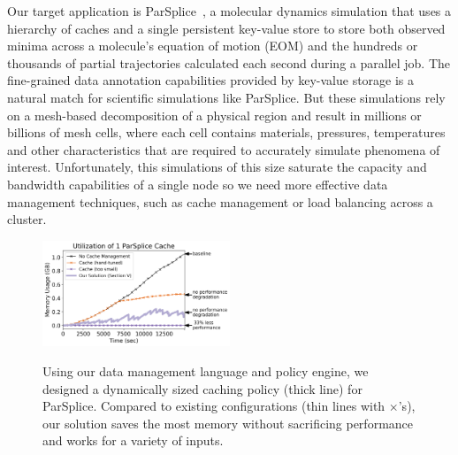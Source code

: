 Our target application is ParSplice~\cite{perez:jctc20150parsplice}, a
molecular dynamics simulation that uses a hierarchy of caches and a single
persistent key-value store to store both observed minima across a molecule's
equation of motion (EOM) and the hundreds or thousands of partial trajectories
calculated each second during a parallel job.  The fine-grained data annotation
capabilities provided by key-value storage is a natural match for scientific
simulations like ParSplice. But these simulations rely on a mesh-based
decomposition of a physical region and result in millions or billions of mesh
cells, where each cell contains materials, pressures, temperatures and other
characteristics that are required to accurately simulate phenomena of interest.
Unfortunately, this simulations of this size saturate the capacity and bandwidth
capabilities of a single node so we need more effective data management
techniques, such as cache management or load balancing across a cluster.

\begin{figure}[t]
\noindent\includegraphics[width=0.5\textwidth]{figures/cache-management.png}\\
\caption{Using our data management language and policy engine, we designed a
dynamically sized caching policy (thick line) for ParSplice.  Compared to
existing configurations (thin lines with \(\times\)'s), our solution saves the most
memory without sacrificing performance and works for a variety of inputs.
\label{fig:cache-management}}
\end{figure}

